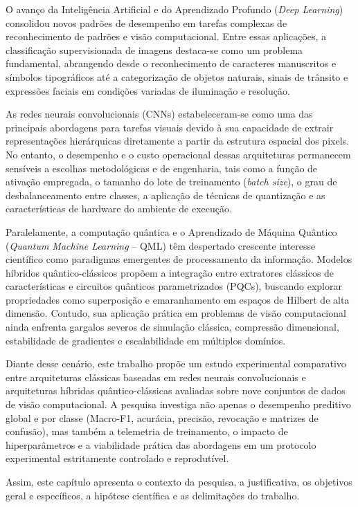 \documentclass[
    12pt,
    openright,
    oneside,
    a4paper,
    english,
    brazil
]{abntex2}
\begin{document}
O avanço da Inteligência Artificial e do Aprendizado Profundo (\textit{Deep Learning}) consolidou novos padrões de desempenho em tarefas complexas de reconhecimento de padrões e visão computacional. Entre essas aplicações, a classificação supervisionada de imagens destaca-se como um problema fundamental, abrangendo desde o reconhecimento de caracteres manuscritos e símbolos tipográficos até a categorização de objetos naturais, sinais de trânsito e expressões faciais em condições variadas de iluminação e resolução.

As redes neurais convolucionais (CNNs) estabeleceram-se como uma das principais abordagens para tarefas visuais devido à sua capacidade de extrair representações hierárquicas diretamente a partir da estrutura espacial dos pixels. No entanto, o desempenho e o custo operacional dessas arquiteturas permanecem sensíveis a escolhas metodológicas e de engenharia, tais como a função de ativação empregada, o tamanho do lote de treinamento (\textit{batch size}), o grau de desbalanceamento entre classes, a aplicação de técnicas de quantização e as características de hardware do ambiente de execução.

Paralelamente, a computação quântica e o Aprendizado de Máquina Quântico (\textit{Quantum Machine Learning} -- QML) têm despertado crescente interesse científico como paradigmas emergentes de processamento da informação. Modelos híbridos quântico-clássicos propõem a integração entre extratores clássicos de características e circuitos quânticos parametrizados (PQCs), buscando explorar propriedades como superposição e emaranhamento em espaços de Hilbert de alta dimensão. Contudo, sua aplicação prática em problemas de visão computacional ainda enfrenta gargalos severos de simulação clássica, compressão dimensional, estabilidade de gradientes e escalabilidade em múltiplos domínios.

Diante desse cenário, este trabalho propõe um estudo experimental comparativo entre arquiteturas clássicas baseadas em redes neurais convolucionais e arquiteturas híbridas quântico-clássicas avaliadas sobre nove conjuntos de dados de visão computacional. A pesquisa investiga não apenas o desempenho preditivo global e por classe (Macro-F1, acurácia, precisão, revocação e matrizes de confusão), mas também a telemetria de treinamento, o impacto de hiperparâmetros e a viabilidade prática das abordagens em um protocolo experimental estritamente controlado e reprodutível.

Assim, este capítulo apresenta o contexto da pesquisa, a justificativa, os objetivos geral e específicos, a hipótese científica e as delimitações do trabalho.
\end{document}
